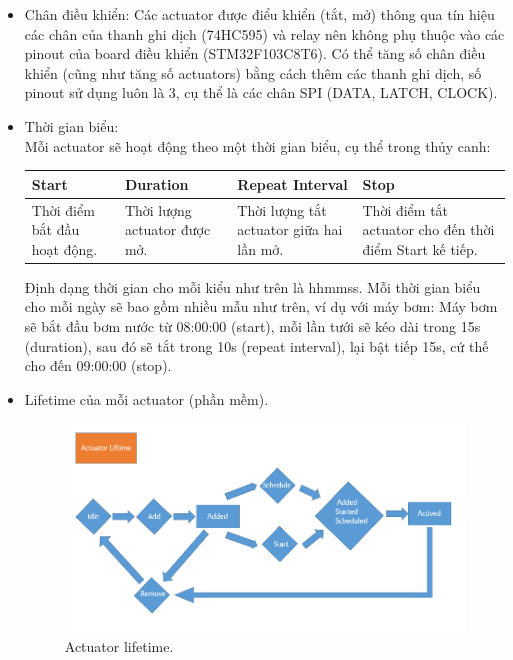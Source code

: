 \documentclass[a4paper,12pt,oneside]{article}
\begin{document}
\begin{itemize}
\item Chân điều khiển: Các actuator được điểu khiển (tắt, mở) thông qua tín hiệu các chân của thanh ghi dịch (74HC595) và relay nên không phụ thuộc vào các pinout của board điều khiển (STM32F103C8T6). Có thể tăng số chân điều khiển (cũng như tăng số actuators) bằng cách thêm các thanh ghi dịch, số pinout sử dụng luôn là 3, cụ thể là các chân SPI (DATA, LATCH, CLOCK).

\item Thời gian biểu:\\
Mỗi actuator sẽ hoạt động theo một thời gian biểu, cụ thể trong thủy canh:

\begin{center}
\begin{tabularx}{\linewidth}{ |X|X|X|X| }
\hline
Start & Duration & Repeat Interval & Stop\\
\hline
Thời điểm bắt đầu hoạt động. & Thời lượng actuator được mở. & Thời lượng tắt actuator giữa hai lần mở. & Thời điểm tắt actuator cho đến thời điểm Start kế tiếp.\\
\hline
\end{tabularx}
\end{center}

\noindent Định dạng thời gian cho mỗi kiểu như trên là hhmmss. Mỗi thời gian biểu cho mỗi ngày sẽ bao gồm nhiều mẫu như trên, ví dụ với máy bơm: Máy bơm sẽ bắt đầu bơm nước từ 08:00:00 (start), mỗi lần tưới sẽ kéo dài trong 15s (duration), sau đó sẽ tắt trong 10s (repeat interval), lại bật tiếp 15s, cứ thế cho đến 09:00:00 (stop).


\item Lifetime của mỗi actuator (phần mềm).

\begin{figure}[H]
	\centering
	\includegraphics[scale=0.7]{hinh/actuator_lifetime.PNG}
	\caption{Actuator lifetime.}
\end{figure}


\end{itemize}
\end{document}
